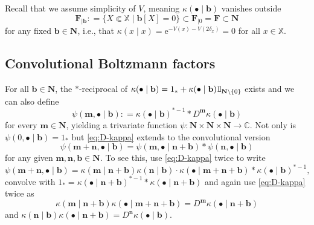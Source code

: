 \documentclass[reqno, 11pt]{amsart}
\theoremstyle{definition}
\newcommand{\e}{\mathrm{e}}
\newcommand{\C}{\mathbb{C}}
\newcommand{\X}{\mathbb X}
\newcommand{\be}{\begin{equation}}
\newcommand{\ee}{\end{equation}}
\def\1{{\mathchoice {1\mskip-4mu\mathrm l}      
{1\mskip-4mu\mathrm l}
{1\mskip-4.5mu\mathrm l} {1\mskip-5mu\mathrm l}}}
\begin{document}
Recall that we assume simplicity of $V$, meaning $\kappa(\bullet \mid \mathbf b)$ vanishes outside
\[
	\mathbf F_{\mid \mathbf b} : = \{X \Subset \X \mid \mathbf b[X] = 0\} \subset \mathbf F_{\mid 0} = \mathbf F \subset \mathbf N
\]
for any fixed $\mathbf b \in \mathbf N$, i.e., that $\kappa(x \mid x) = \e^{-V(x) - V(2 \delta_x)} = 0$ for all $x \in \X$.

\subsection{Convolutional Boltzmann factors}

For all $\mathbf b \in \mathbf N$, the $\ast$-reciprocal of $\kappa(\bullet \mid \mathbf b) = 1_\ast + \kappa(\bullet \mid \mathbf b) \1_{\mathbf N \setminus \{0\}}$ exists and we can also define
\[
	\psi(\mathbf m, \bullet \mid \mathbf b) : = \kappa(\bullet \mid \mathbf b)^{\ast -1} \ast D^\mathbf m \kappa(\bullet \mid \mathbf b)
\]
for every $\mathbf m \in \mathbf N$, yielding a trivariate function $\psi : \mathbf N \times \mathbf N \times \mathbf N \to \C$. 
Not only is $\psi(0, \bullet \mid \mathbf b) = 1_\ast$ but \eqref{eq:D-kappa} extends to the convolutional version
\be \label{eq:psi-conditional-convolution}
	\psi(\mathbf m + \mathbf n, \bullet \mid \mathbf b) = \psi(\mathbf m, \bullet \mid \mathbf n + \mathbf b) \ast \psi(\mathbf n, \bullet \mid \mathbf b)
\ee
for any given $\mathbf m, \mathbf n, \mathbf b \in \mathbf N$. 
To see this, use \eqref{eq:D-kappa} twice to write
\[
	\psi(\mathbf m + \mathbf n, \bullet \mid \mathbf b) = \kappa(\mathbf m \mid \mathbf n + \mathbf b) \kappa(\mathbf n \mid \mathbf b) \cdot \kappa(\bullet \mid \mathbf m + \mathbf n + \mathbf b) \ast \kappa(\bullet \mid \mathbf b)^{\ast -1},
\]
convolve with $1_\ast = \kappa(\bullet \mid \mathbf n + \mathbf b)^{\ast -1} \ast \kappa(\bullet \mid \mathbf n + \mathbf b)$ and again use \eqref{eq:D-kappa} twice as
\[
	\kappa(\mathbf m \mid \mathbf n + \mathbf b) \kappa(\bullet \mid \mathbf m + \mathbf n + \mathbf b) = D^\mathbf m \kappa(\bullet \mid \mathbf n + \mathbf b)
\]
and $\kappa(\mathbf n \mid \mathbf b) \kappa(\bullet \mid \mathbf n + \mathbf b) = D^\mathbf n \kappa(\bullet \mid \mathbf b)$.
\end{document}
